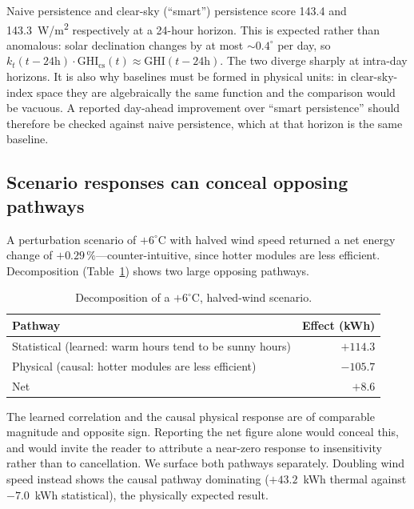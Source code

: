 \documentclass[conference]{IEEEtran}
\begin{document}
Naive persistence and clear-sky (``smart'') persistence score
143.4 and 143.3~W/m\textsuperscript{2} respectively at a 24-hour
horizon. This is expected rather than anomalous: solar declination
changes by at most ${\sim}0.4^{\circ}$ per day, so
$k_{t}(t-24\mathrm{h}) \cdot \mathrm{GHI}_{\mathrm{cs}}(t) \approx
\mathrm{GHI}(t-24\mathrm{h})$. The two diverge sharply at intra-day
horizons. It is also why baselines must be formed in physical units:
in clear-sky-index space they are algebraically the same function and
the comparison would be vacuous. A reported day-ahead improvement over
``smart persistence'' should therefore be checked against naive
persistence, which at that horizon is the same baseline.

\subsection{Scenario responses can conceal opposing pathways}
\label{sec:f6}

A perturbation scenario of $+6^{\circ}$C with halved wind speed
returned a net energy change of $+0.29\,\%$---counter-intuitive, since
hotter modules are less efficient. Decomposition
(Table~\ref{tab:f6}) shows two large opposing pathways.

\begin{table}[!t]
\caption{Decomposition of a $+6^{\circ}$C, halved-wind scenario.}
\label{tab:f6}
\centering
\begin{tabular}{lr}
\toprule
Pathway & Effect (kWh) \\
\midrule
Statistical (learned: warm hours tend to be sunny hours) & $+114.3$ \\
Physical (causal: hotter modules are less efficient)     & $-105.7$ \\
\midrule
Net & $+8.6$ \\
\bottomrule
\end{tabular}
\end{table}

The learned correlation and the causal physical response are of
comparable magnitude and opposite sign. Reporting the net figure alone
would conceal this, and would invite the reader to attribute a
near-zero response to insensitivity rather than to cancellation. We
surface both pathways separately. Doubling wind speed instead shows the
causal pathway dominating ($+43.2$~kWh thermal against $-7.0$~kWh
statistical), the physically expected result.
\end{document}
